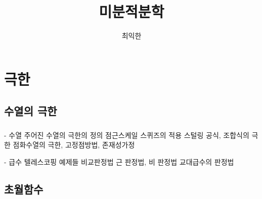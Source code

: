 \documentclass{../../large}
\begin{document}
\title{미분적분학}
\author{최익한}
\maketitle
\tableofcontents


\part{극한}


\chapter{수열의 극한}

\section{}
\section{}
\section{}
\section{}


- 수열
    주어진 수열의 극한의 정의
    점근스케일
    스퀴즈의 적용
    스털링 공식, 조합식의 극한
    점화수열의 극한, 고정점방법, 존재성가정

- 급수
    텔레스코핑 예제들
    비교판정법
    근 판정법, 비 판정법
    교대급수의 판정법




\chapter{초월함수}

\section{}
\section{}
\section{}
\section{}
\end{document}
